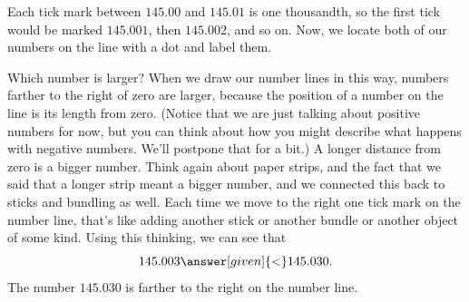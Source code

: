 \documentclass{ximera}
\begin{document}
\begin{example}
\begin{image}
 \end{image}
Each tick mark between $145.00$ and $145.01$ is one thousandth, so the first tick would be marked $145.001$, then $145.002$, and so on. Now, we locate both of our numbers on the line with a dot and label them.


\begin{image}
 \end{image}

Which number is larger? When we draw our number lines in this way, numbers farther to the right of zero are larger, because the position of a number on the line is its length from zero. (Notice that we are just talking about positive numbers for now, but you can think about how you might describe what happens with negative numbers. We'll postpone that for a bit.) A longer distance from zero is a bigger number. Think again about paper strips, and the fact that we said that a longer strip meant a bigger number, and we connected this back to sticks and bundling as well. Each time we move to the right one tick mark on the number line, that's like adding another stick or another bundle or another object of some kind. Using this thinking, we can see that 
\[
145.003 \answer[given]{<} 145.030.
\]
The number $145.030$ is farther to the right on the number line.

\end{example}
\end{document}
